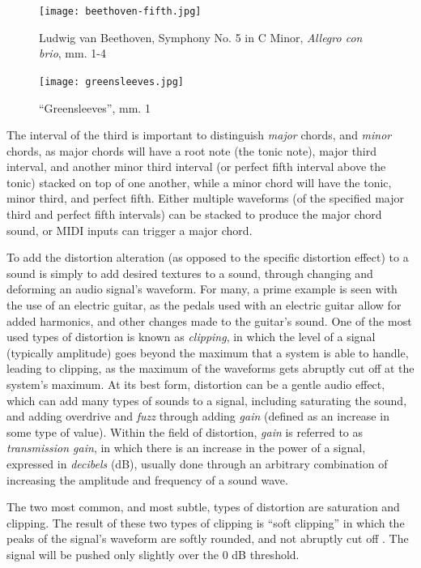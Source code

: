 \begin{figure}[ht]
  \centering
  \texttt{[image: beethoven-fifth.jpg]}
  \caption{Ludwig van Beethoven, Symphony No. 5 in C Minor, \textit{Allegro con brio}, mm. 1-4}
  \label{fig:beethoven-fifth}
\end{figure}

\begin{figure}[H]
  \centering
  \texttt{[image: greensleeves.jpg]}
  \caption{``Greensleeves'', mm. 1}
  \label{fig:greensleeves}
\end{figure}

The interval of the third is important to distinguish \textit{major} chords, and \textit{minor} chords, as major chords will have a root note (the tonic note), major third interval, and another minor third interval (or perfect fifth interval above the tonic) stacked on top of one another, while a minor chord will have the tonic, minor third, and perfect fifth. Either multiple waveforms (of the specified major third and perfect fifth intervals) can be stacked to produce the major chord sound, or MIDI inputs can trigger a major chord.

To add the distortion alteration (as opposed to the specific distortion effect) to a sound is simply to add desired textures to a sound, through changing and deforming an audio signal's waveform. For many, a prime example is seen with the use of an electric guitar, as the pedals used with an electric guitar allow for added harmonics, and other changes made to the guitar's sound. One of the most used types of distortion is known as \textit{clipping}, in which the level of a signal (typically amplitude) goes beyond the maximum that a system is able to handle, leading to clipping, as the maximum of the waveforms gets abruptly cut off at the system's maximum. At its best form, distortion can be a gentle audio effect, which can add many types of sounds to a signal, including saturating the sound, and adding overdrive and \textit{fuzz} through adding \textit{gain} (defined as an increase in some type of value). Within the field of distortion, \textit{gain} is referred to as \textit{transmission gain}, in which there is an increase in the power of a signal, expressed in \textit{decibels} (dB), usually done through an arbitrary combination of increasing the amplitude and frequency of a sound wave.

The two most common, and most subtle, types of distortion are saturation and clipping. The result of these two types of clipping is ``soft clipping'' in which the peaks of the signal's waveform are softly rounded, and not abruptly cut off \cite{Tarr_2019}. The signal will be pushed only slightly over the 0 dB threshold. 

